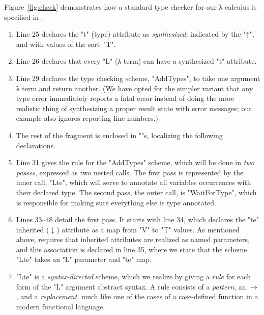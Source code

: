 \documentclass[letterpaper]{llncs}
\begin{document}
\begin{example}[analysis]
  Figure~\ref{fig:check} demonstrates how a standard type checker for our λ calculus is specified in
  \HAX.
  \begin{enumerate}

  \item Line 25 declares the "t" (type) attribute as \emph{synthesized}, indicated by the "↑", and
    with values of the sort~"T".

  \item Line 26 declares that every "L" (λ term) can have a synthesized "t" attribute.

  \item Line 29 declares the type checking scheme, "AddTypes", to take one argument λ term and
    return another. (We have opted for the simpler variant that any type error immediately reports a
    fatal error instead of doing the more realistic thing of synthesizing a proper result state with
    error messages; our example also ignores reporting line numbers.)

  \item The rest of the fragment is enclosed in "{}"s, localizing the following declarations.

  \item Line 31 gives the rule for the "AddTypes" scheme, which will be done in \emph{two passes},
    expressed as two nested calls. The first pass is represented by the inner call, "Lte", which
    will serve to annotate all variables occurrences with their declared type. The second pass, the
    outer call, is "WaitForType", which is responsible for making sure everything else is type
    annotated.

  \item Lines 33--48 detail the first pass. It starts with line 34, which declares the "te"
    inherited ($↓$) attribute as a map from "V" to "T" values. As mentioned above, \HAX requires
    that inherited attributes are realized as named parameters, and this association is declared in
    line 35, where we state that the scheme "Lte" takes an "L" parameter and "te" map.

  \item "Lte" is a \emph{syntax-directed} scheme, which we realize by giving a \emph{rule} for each
    form of the "L" argument abstract syntax. A rule consists of a \emph{pattern}, an $→$, and a
    \emph{replacement}, much like one of the cases of a case-defined function in a modern functional
    language.


\end{enumerate}
\end{example}
\end{document}
